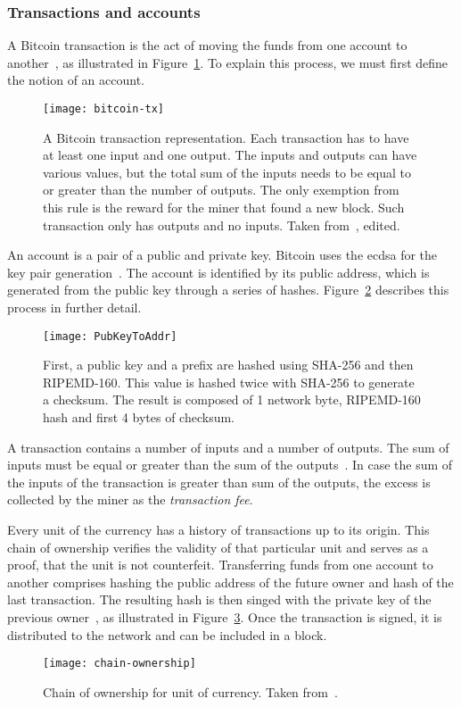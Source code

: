 \subsubsection{Transactions and accounts}
A Bitcoin transaction is the act of moving the funds from one account to another~\cite{Judmayer2017BlocksMechanisms}, as illustrated in Figure~\ref{fig:bitcoin-tx}. To explain this process, we must first define the notion of an account.

\begin{figure}[ht]
    \centering
    \texttt{[image: bitcoin-tx]}
    \caption{A Bitcoin transaction representation. Each transaction has to have at least one input and one output. The inputs and outputs can have various values, but the total sum of the inputs needs to be equal to or greater than the number of outputs. The only exemption from this rule is the reward for the miner that found a new block. Such transaction only has outputs and no inputs. Taken from~\cite{NakamotoBitcoin:System}, edited.}
    \label{fig:bitcoin-tx}
\end{figure}

An account is a pair of a public and private key. Bitcoin uses the \acrfull{ecdsa} for the key pair generation~\cite{Decker2013InformationNetwork}. The account is identified by its public address, which is generated from the public key through a series of hashes. Figure~\ref{fig:public-address-gen} describes this process in further detail.
% 
\begin{figure}[p]
    \centering
    \texttt{[image: PubKeyToAddr]}
    \caption{First, a public key and a prefix are hashed using SHA-256 and then RIPEMD-160. This value is hashed twice with SHA-256 to generate a checksum. The result is composed of 1 network byte, RIPEMD-160 hash and first 4 bytes of checksum.}
    \label{fig:public-address-gen}
\end{figure}

A transaction contains a number of inputs and a number of outputs. The sum of inputs must be equal or greater than the sum of the outputs~\cite[p. 27]{Judmayer2017BlocksMechanisms}. In case the sum of the inputs of the transaction is greater than sum of the outputs, the excess is collected by the miner as the \textit{transaction fee}.

Every unit of the currency has a history of transactions up to its origin. This chain of ownership verifies the validity of that particular unit and serves as a proof, that the unit is not counterfeit. Transferring funds from one account to another comprises hashing the public address of the future owner and hash of the last transaction. The resulting hash is then singed with the private key of the previous owner~\cite{NakamotoBitcoin:System}, as illustrated in Figure~\ref{fig:chain-ownership}. Once the transaction is signed, it is distributed to the network and can be included in a block.
% 
\begin{figure}[ht]
    \centering
    \texttt{[image: chain-ownership]}
    \caption{Chain of ownership for unit of currency. Taken from~\cite{NakamotoBitcoin:System}.}
    \label{fig:chain-ownership}
\end{figure}

